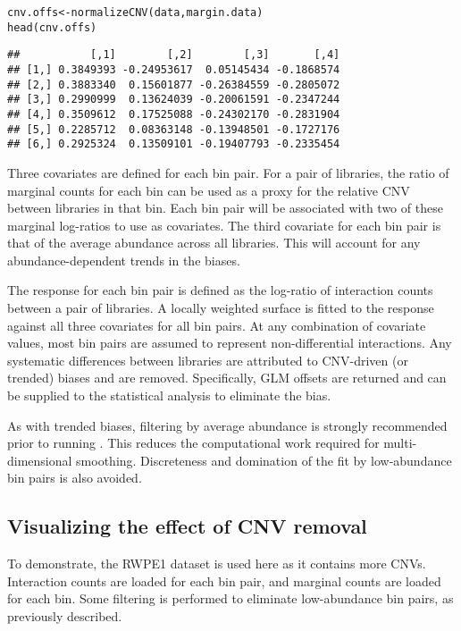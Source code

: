 \documentclass{report}\usepackage[]{graphicx}\usepackage[usenames,dvipsnames]{color}
\newcommand{\hlstd}[1]{\textcolor[rgb]{0.251,0.251,0.251}{#1}}%
\newcommand{\hlkwb}[1]{\textcolor[rgb]{0,0,0}{#1}}%
\newcommand{\hlkwd}[1]{\textcolor[rgb]{0.878,0.439,0.125}{#1}}%
\newenvironment{knitrout}{}{} %
\begin{document}
\begin{knitrout}
\color{fgcolor}\begin{kframe}
\begin{alltt}
\hlstd{cnv.offs} \hlkwb{<-} \hlkwd{normalizeCNV}\hlstd{(data, margin.data)}
\hlkwd{head}\hlstd{(cnv.offs)}
\end{alltt}
\begin{verbatim}
##           [,1]        [,2]        [,3]       [,4]
## [1,] 0.3849393 -0.24953617  0.05145434 -0.1868574
## [2,] 0.3883340  0.15601877 -0.26384559 -0.2805072
## [3,] 0.2990999  0.13624039 -0.20061591 -0.2347244
## [4,] 0.3509612  0.17525088 -0.24302170 -0.2831904
## [5,] 0.2285712  0.08363148 -0.13948501 -0.1727176
## [6,] 0.2925324  0.13509101 -0.19407793 -0.2335454
\end{verbatim}
\end{kframe}
\end{knitrout}

Three covariates are defined for each bin pair.
For a pair of libraries, the ratio of marginal counts for each bin can be used as a proxy for the relative CNV between libraries in that bin.
Each bin pair will be associated with two of these marginal log-ratios to use as covariates.
The third covariate for each bin pair is that of the average abundance across all libraries.
This will account for any abundance-dependent trends in the biases.

The response for each bin pair is defined as the log-ratio of interaction counts between a pair of  libraries.
A locally weighted surface is fitted to the response against all three covariates for all bin pairs.
At any combination of covariate values, most bin pairs are assumed to represent non-differential interactions.
Any systematic differences between libraries are attributed to CNV-driven (or trended) biases and are removed.
Specifically, GLM offsets are returned and can be supplied to the statistical analysis to eliminate the bias.

As with trended biases, filtering by average abundance is strongly recommended prior to running .
This reduces the computational work required for multi-dimensional smoothing.
Discreteness and domination of the fit by low-abundance bin pairs is also avoided.

\subsection{Visualizing the effect of CNV removal}
To demonstrate, the RWPE1 dataset \cite{rickman2012oncogene} is used here as it contains more CNVs.
Interaction counts are loaded for each bin pair, and marginal counts are loaded for each bin.
Some filtering is performed to eliminate low-abundance bin pairs, as previously described.
\end{document}
